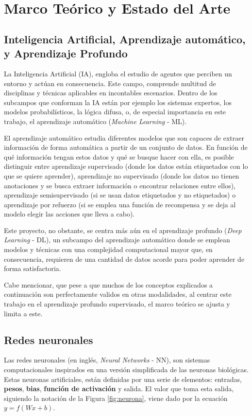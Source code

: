 \section{Marco Teórico y Estado del Arte}

\subsection{Inteligencia Artificial, Aprendizaje automático, y Aprendizaje Profundo}
La Inteligencia Artificial (IA), engloba el estudio de agentes que perciben un entorno y actúan en consecuencia. Este campo, comprende multitud de disciplinas y técnicas aplicables en incontables escenarios. Dentro de los subcampos que conforman la IA están por ejemplo los sistemas expertos, los modelos probabilísticos, la lógica difusa, o, de especial importancia en este trabajo, el aprendizaje automático (\textit{Machine Learning} - ML). 

El aprendizaje automático estudia diferentes modelos que son capaces de extraer información de forma automática a partir de un conjunto de datos. En función de qué información tengan estos datos y qué se busque hacer con ella, es posible distinguir entre aprendizaje supervisado (donde los datos están etiquetados con lo que se quiere aprender), aprendizaje no supervisado (donde los datos no tienen anotaciones y se busca extraer información o encontrar relaciones entre ellos), aprendizaje semisupervisado (si se usan datos etiquetados y no etiquetados) o aprendizaje por refuerzo (si se emplea una función de recompensa y se deja al modelo elegir las acciones que lleva a cabo).

Este proyecto, no obstante, se centra más aún en el aprendizaje profundo (\textit{Deep Learning} - DL), un subcampo del aprendizaje automático donde se emplean modelos y técnicas con una complejidad computacional mayor que, en consecuencia, requieren de una cantidad de datos acorde para poder aprender de forma satisfactoria.

Cabe mencionar, que pese a que muchos de los conceptos explicados a continuación son perfectamente validos en otras modalidades, al centrar este trabajo en el aprendizaje profundo supervisado, el marco teórico se ajusta y limita a este. 

\subsection{Redes neuronales}
Las redes neuronales (en inglés, \textit{Neural Networks} - NN), son sistemas computacionales inspirados en una versión simplificada de las neuronas biológicas. Estas neuronas artificiales, están definidas por una serie de elementos: entradas, \textbf{pesos}, \textbf{bias}, \textbf{función de activación} y salida. El valor que toma esta salida, siguiendo la notación de la Figura \ref{fig:neurona}, viene dado por la ecuación $y = f(Wx + b)$.

